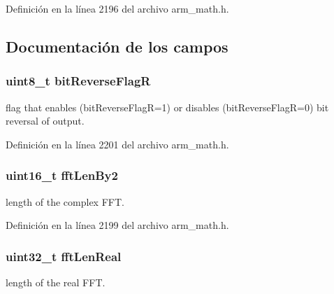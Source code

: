 Definición en la línea 2196 del archivo arm\+\_\+math.\+h.



\subsection{Documentación de los campos}
\subsubsection[{\texorpdfstring{bit\+Reverse\+FlagR}{bitReverseFlagR}}]{\setlength{\rightskip}{0pt plus 5cm}uint8\+\_\+t bit\+Reverse\+FlagR}\hypertarget{structarm__rfft__instance__f32_ad56ec2425e2422108b8767b43d944591}{}\label{structarm__rfft__instance__f32_ad56ec2425e2422108b8767b43d944591}
flag that enables (bit\+Reverse\+FlagR=1) or disables (bit\+Reverse\+FlagR=0) bit reversal of output. 

Definición en la línea 2201 del archivo arm\+\_\+math.\+h.

\subsubsection[{\texorpdfstring{fft\+Len\+By2}{fftLenBy2}}]{\setlength{\rightskip}{0pt plus 5cm}uint16\+\_\+t fft\+Len\+By2}\hypertarget{structarm__rfft__instance__f32_a206b7cd92c35fde3432e5b9a0650c42c}{}\label{structarm__rfft__instance__f32_a206b7cd92c35fde3432e5b9a0650c42c}
length of the complex F\+FT. 

Definición en la línea 2199 del archivo arm\+\_\+math.\+h.

\subsubsection[{\texorpdfstring{fft\+Len\+Real}{fftLenReal}}]{\setlength{\rightskip}{0pt plus 5cm}uint32\+\_\+t fft\+Len\+Real}\hypertarget{structarm__rfft__instance__f32_adf0d4604cf5546075d9d4cf122d6c986}{}\label{structarm__rfft__instance__f32_adf0d4604cf5546075d9d4cf122d6c986}
length of the real F\+FT. 

